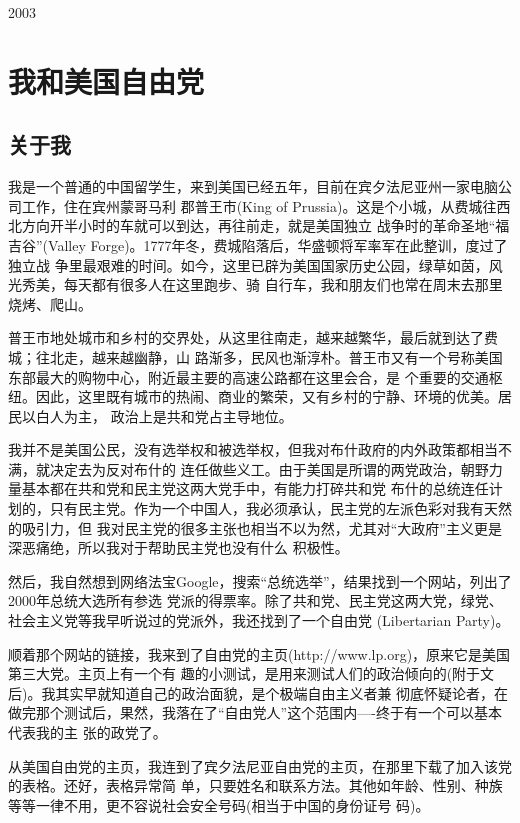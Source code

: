 ﻿\documentclass[11pt]{article}
\begin{document}
\begin{flushright}
2003
\end{flushright}

\clearpage
\section{我和美国自由党}

\subsection{关于我}

我是一个普通的中国留学生，来到美国已经五年，目前在宾夕法尼亚州一家电脑公司工作，住在宾州蒙哥马利
郡普王市(King of Prussia)。这是个小城，从费城往西北方向开半小时的车就可以到达，再往前走，就是美国独立
战争时的革命圣地``福吉谷''(Valley Forge)。1777年冬，费城陷落后，华盛顿将军率军在此整训，度过了独立战
争里最艰难的时间。如今，这里已辟为美国国家历史公园，绿草如茵，风光秀美，每天都有很多人在这里跑步、骑
自行车，我和朋友们也常在周末去那里烧烤、爬山。

普王市地处城市和乡村的交界处，从这里往南走，越来越繁华，最后就到达了费城；往北走，越来越幽静，山
路渐多，民风也渐淳朴。普王市又有一个号称美国东部最大的购物中心，附近最主要的高速公路都在这里会合，是
个重要的交通枢纽。因此，这里既有城市的热闹、商业的繁荣，又有乡村的宁静、环境的优美。居民以白人为主，
政治上是共和党占主导地位。

我并不是美国公民，没有选举权和被选举权，但我对布什政府的内外政策都相当不满，就决定去为反对布什的
连任做些义工。由于美国是所谓的两党政治，朝野力量基本都在共和党和民主党这两大党手中，有能力打碎共和党
布什的总统连任计划的，只有民主党。作为一个中国人，我必须承认，民主党的左派色彩对我有天然的吸引力，但
我对民主党的很多主张也相当不以为然，尤其对``大政府''主义更是深恶痛绝，所以我对于帮助民主党也没有什么
积极性。

然后，我自然想到网络法宝Google，搜索``总统选举''，结果找到一个网站，列出了2000年总统大选所有参选
党派的得票率。除了共和党、民主党这两大党，绿党、社会主义党等我早听说过的党派外，我还找到了一个自由党
(Libertarian Party)。

顺着那个网站的链接，我来到了自由党的主页(http://www.lp.org)，原来它是美国第三大党。主页上有一个有
趣的小测试，是用来测试人们的政治倾向的(附于文后)。我其实早就知道自己的政治面貌，是个极端自由主义者兼
彻底怀疑论者，在做完那个测试后，果然，我落在了``自由党人''这个范围内----终于有一个可以基本代表我的主
张的政党了。

从美国自由党的主页，我连到了宾夕法尼亚自由党的主页，在那里下载了加入该党的表格。还好，表格异常简
单，只要姓名和联系方法。其他如年龄、性别、种族等等一律不用，更不容说社会安全号码(相当于中国的身份证号
码)。
\end{document}
